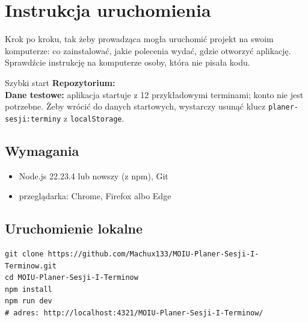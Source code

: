 \section{Instrukcja uruchomienia}\label{sec:uruchomienie}

\begin{instrukcja}[wymagane]
Krok po kroku, tak żeby prowadząca mogła uruchomić projekt na swoim komputerze: co zainstalować, jakie
polecenia wydać, gdzie otworzyć aplikację. Sprawdźcie instrukcję na komputerze osoby, która nie
pisała kodu.
\end{instrukcja}

\begin{ramka}{Szybki start}
\textbf{Repozytorium:} \\
\textbf{Dane testowe:} aplikacja startuje z 12 przykładowymi terminami; konto nie jest potrzebne. Żeby wrócić do danych startowych, wystarczy usunąć klucz \texttt{planer-sesji:terminy} z \texttt{localStorage}.
\end{ramka}

\subsection{Wymagania}
\begin{itemize}
  \item Node.js 22.23.4 lub nowszy (z npm), Git
  \item przeglądarka: Chrome, Firefox albo Edge
\end{itemize}

\subsection{Uruchomienie lokalne}
\noindent\begin{minipage}{\linewidth}
\begin{lstlisting}[style=konsola]
git clone https://github.com/Machux133/MOIU-Planer-Sesji-I-Terminow.git
cd MOIU-Planer-Sesji-I-Terminow
npm install
npm run dev
# adres: http://localhost:4321/MOIU-Planer-Sesji-I-Terminow/
\end{lstlisting}
\end{minipage}
